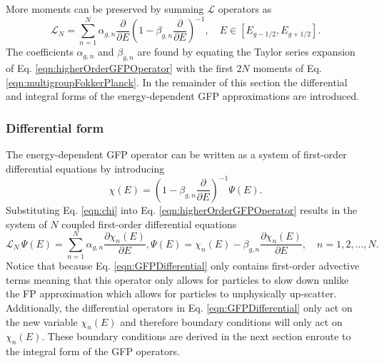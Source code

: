 More moments can be preserved by summing $\mathcal{L}$ operators as
\begin{equation} \label{eqn:higherOrderGFPOperator}
  \mathcal{L}_N = \sum_{n=1}^{N} \alpha_{g,n} \dfrac{\partial}{\partial E} \left(1 - \beta_{g,n} \dfrac{\partial}{\partial E}\right)^{-1}, \quad E \in [E_{g-1/2}, E_{g+1/2}].
\end{equation}
The coefficients $\alpha_{g,n}$ and $\beta_{g,n}$ are found by equating the Taylor series expansion of Eq. \eqref{eqn:higherOrderGFPOperator} with the first $2N$ moments of Eq. \eqref{eqn:multigroupFokkerPlanck}. In the remainder of this section the differential and integral forms of the energy-dependent GFP approximations are introduced.

\subsubsection{Differential form}
The energy-dependent GFP operator can be written as a system of first-order differential equations by introducing
\begin{equation} \label{eqn:chi}
  \chi(E) = \left(1 - \beta_{g,n} \dfrac{\partial}{\partial E}\right)^{-1} \Psi(E).
\end{equation}
Substituting Eq. \eqref{eqn:chi} into Eq. \eqref{eqn:higherOrderGFPOperator} results in the system of $N$ coupled first-order differential equations
\begin{subequations} \label{eqn:GFPDifferential}
  \begin{equation}
    \mathcal{L}_N \, \Psi(E) = \sum_{n=1}^{N} \alpha_{g,n} \dfrac{\partial \chi_n(E)}{\partial E},
  \end{equation}
  \begin{equation}
    \Psi(E) = \chi_n(E) - \beta_{g,n} \dfrac{\partial \chi_n(E)}{\partial E}, \quad n = 1,2,\ldots,N.
  \end{equation}
\end{subequations}
Notice that because Eq. \eqref{eqn:GFPDifferential} only contains first-order advective terms meaning that this operator only allows for particles to slow down unlike the FP approximation which allows for particles to unphysically up-scatter. Additionally, the differential operators in Eq. \eqref{eqn:GFPDifferential} only act on the new variable $\chi_n(E)$ and therefore boundary conditions will only act on $\chi_n(E)$. These boundary conditions are derived in the next section enroute to the integral form of the GFP operators.

